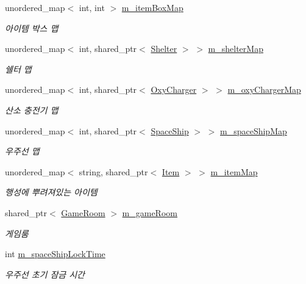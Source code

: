 \begin{DoxyCompactItemize}
unordered\+\_\+map$<$ int, int $>$ \hyperlink{class_server_a4212564accb77fd496f08ff3ec292657}{m\+\_\+item\+Box\+Map}
\begin{DoxyCompactList}\small\item\em 아이템 박스 맵 \end{DoxyCompactList}\item 
unordered\+\_\+map$<$ int, shared\+\_\+ptr$<$ \hyperlink{class_shelter}{Shelter} $>$ $>$ \hyperlink{class_server_a75eda393f27b20a83e6effb5405e902a}{m\+\_\+shelter\+Map}
\begin{DoxyCompactList}\small\item\em 쉘터 맵 \end{DoxyCompactList}\item 
unordered\+\_\+map$<$ int, shared\+\_\+ptr$<$ \hyperlink{class_oxy_charger}{Oxy\+Charger} $>$ $>$ \hyperlink{class_server_ae2e40fd2b3d85dd1c92ab7bc6e6b7d65}{m\+\_\+oxy\+Charger\+Map}
\begin{DoxyCompactList}\small\item\em 산소 충전기 맵 \end{DoxyCompactList}\item 
unordered\+\_\+map$<$ int, shared\+\_\+ptr$<$ \hyperlink{class_space_ship}{Space\+Ship} $>$ $>$ \hyperlink{class_server_aa20a2aa16045180559ef43a7087e7e95}{m\+\_\+space\+Ship\+Map}
\begin{DoxyCompactList}\small\item\em 우주선 맵 \end{DoxyCompactList}\item 
unordered\+\_\+map$<$ string, shared\+\_\+ptr$<$ \hyperlink{class_item}{Item} $>$ $>$ \hyperlink{class_server_a892047fc49e676067b880f31d0d22c36}{m\+\_\+item\+Map}
\begin{DoxyCompactList}\small\item\em 행성에 뿌려져있는 아이템 \end{DoxyCompactList}\item 
shared\+\_\+ptr$<$ \hyperlink{class_game_room}{Game\+Room} $>$ \hyperlink{class_server_a77f414d5bb41dd5de8626d8cd621113c}{m\+\_\+game\+Room}
\begin{DoxyCompactList}\small\item\em 게임룸 \end{DoxyCompactList}\item 
int \hyperlink{class_server_a21ee3e9152293a6e6d47fd569ee3f37a}{m\+\_\+space\+Ship\+Lock\+Time}
\begin{DoxyCompactList}\small\item\em 우주선 초기 잠금 시간 \end{DoxyCompactList}\item 

\end{DoxyCompactItemize}
